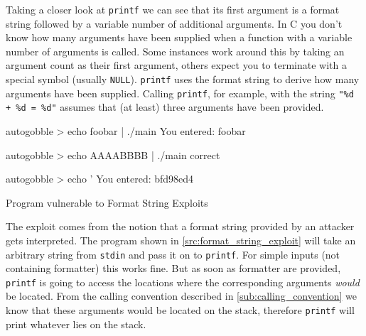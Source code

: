\documentclass[article]{uibk}
\begin{document}
Taking a closer look at \texttt{printf} we can see that its first argument is a
format string followed by a variable number of additional arguments. In C you
don't know how many arguments have been supplied when a function with a
variable number of arguments is called. Some instances work around this by
taking an argument count as their first argument, others expect you to
terminate with a special symbol (usually \texttt{NULL}). \texttt{printf} uses
the format string to derive how many arguments have been supplied. Calling
\texttt{printf}, for example, with the string \texttt{"\%d + \%d = \%d"}
assumes that (at least) three arguments have been provided.

\begin{listing}[h!]
    \begin{minipage}[t]{0.47\textwidth}
    \end{minipage}
    \begin{minipage}[t]{0.47\textwidth}
        \begin{pre*}{autogobble}
            > echo foobar | ./main
            You entered:
            foobar
        \end{pre*}
        \medskip
        \begin{pre*}{autogobble}
            > echo AAAABBBB | ./main
            correct
        \end{pre*}
        \medskip
        \begin{pre*} {autogobble}
            > echo '%
            You entered:
            bfd98ed4
        \end{pre*}
    \end{minipage}
    \caption{Program vulnerable to Format String Exploits}
    \label{src:format_string_exploit}
\end{listing}

The exploit comes from the notion that a format string provided by an attacker
gets interpreted. The program shown in \cref{src:format_string_exploit} will
take an arbitrary string from \texttt{stdin} and pass it on to \texttt{printf}.
For simple inputs (not containing formatter) this works fine. But as soon as
formatter are provided, \texttt{printf} is going to access the locations where
the corresponding arguments \emph{would} be located. From the calling
convention described in \cref{sub:calling_convention} we know that these
arguments would be located on the stack, therefore \texttt{printf} will print
whatever lies on the stack.
\end{document}
